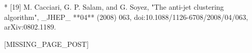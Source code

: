 * [19] M. Cacciari, G. P. Salam, and G. Soyez, "The anti-jet clustering algorithm", _JHEP_ **04** (2008) 063, doi:10.1088/1126-6708/2008/04/063, arXiv:0802.1189.

[MISSING_PAGE_POST]

 